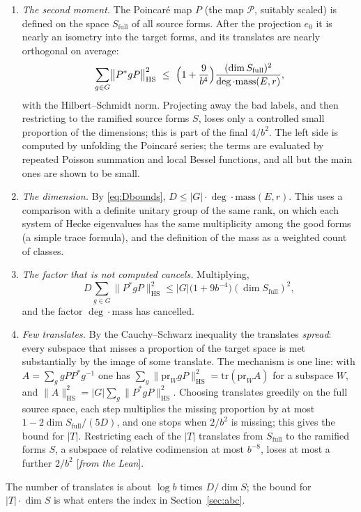 \documentclass[11pt]{amsart}
\numberwithin{equation}{section}
\theoremstyle{definition}
\theoremstyle{remark}
\newcommand{\status}[1]{\textup{[\emph{#1}]}}
\begin{document}
\begin{enumerate}[leftmargin=2em]
\item \emph{The second moment.} The Poincar\'e map $P$ (the map $\mathcal P$, suitably scaled) is defined on the space $S_{\mathrm{full}}$ of all source forms. After the projection $e_0$ it is nearly an isometry into the target forms, and its translates are nearly orthogonal on average:
\begin{equation}\label{eq:secondmoment}
 \sum_{g\in G}\bigl\|P^*gP\bigr\|_{\mathrm{HS}}^2\ \le\ \Bigl(1+\frac9{b^4}\Bigr)\frac{(\dim S_{\mathrm{full}})^2}{\deg\cdot\mathrm{mass}(E,r)},
\end{equation}
with the Hilbert--Schmidt norm. Projecting away the bad labels, and then restricting to the ramified source forms $S$, loses only a controlled small proportion of the dimensions; this is part of the final $4/b^2$. The left side is computed by unfolding the Poincar\'e series; the terms are evaluated by repeated Poisson summation and local Bessel functions, and all but the main ones are shown to be small.
\item \emph{The dimension.} By \eqref{eq:Dbounds}, $D\le|G|\cdot\deg\cdot\mathrm{mass}(E,r)$. This uses a comparison with a definite unitary group of the same rank, on which each system of Hecke eigenvalues has the same multiplicity among the good forms (a simple trace formula), and the definition of the mass as a weighted count of classes.
\item \emph{The factor that is not computed cancels.} Multiplying,
\begin{equation}
 D\sum_{g\in G}\|P^*gP\|_{\mathrm{HS}}^2\le|G|\bigl(1+9b^{-4}\bigr)(\dim S_{\mathrm{full}})^2 ,
\end{equation}
and the factor $\deg\cdot\mathrm{mass}$ has cancelled.
\item \emph{Few translates.} By the Cauchy--Schwarz inequality the translates \emph{spread}: every subspace that misses a proportion of the target space is met substantially by the image of some translate. The mechanism is one line: with $A=\sum_ggPP^*g^{-1}$ one has $\sum_g\|\mathrm{pr}_WgP\|_{\mathrm{HS}}^2=\mathrm{tr}(\mathrm{pr}_WA)$ for a subspace $W$, and $\|A\|_{\mathrm{HS}}^2=|G|\sum_g\|P^*gP\|_{\mathrm{HS}}^2$. Choosing translates greedily on the full source space, each step multiplies the missing proportion by at most $1-2\dim S_{\mathrm{full}}/(5D)$, and one stops when $2/b^2$ is missing; this gives the bound for $|T|$. Restricting each of the $|T|$ translates from $S_{\mathrm{full}}$ to the ramified forms $S$, a subspace of relative codimension at most $b^{-8}$, loses at most a further $2/b^2$ \status{from the Lean}.
\end{enumerate}
The number of translates is about $\log b$ times $D/\dim S$; the bound for $|T|\cdot\dim S$ is what enters the index in Section~\ref{sec:abc}.
\end{document}
